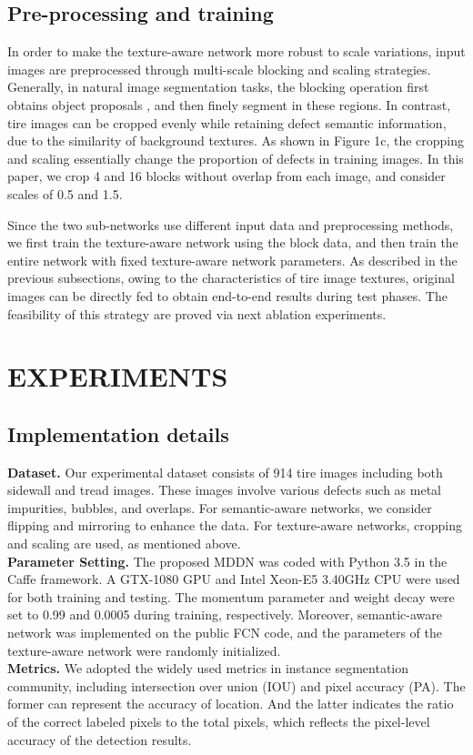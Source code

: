 \documentclass{article}
\begin{document}
\subsection{Pre-processing and training}
\label{Combination}
In order to make the texture-aware network more robust to scale variations, input images are preprocessed through multi-scale blocking and scaling strategies. Generally, in natural image segmentation tasks, the blocking operation first obtains object proposals \cite{girshick2014rich,ren2015faster}, and then finely segment in these regions. In contrast, tire images can be cropped evenly while retaining defect semantic information, due to the similarity of background textures. As shown in Figure 1c, the cropping and scaling essentially change the proportion of defects in training images. In this paper, we crop 4 and 16 blocks without overlap from each image, and consider scales of 0.5 and 1.5.

Since the two sub-networks use different input data and preprocessing methods, we first train the texture-aware network using the block data, and then train the entire network with fixed texture-aware network parameters. As described in the previous subsections, owing to the characteristics of tire image textures, original images can be directly fed to obtain end-to-end results during test phases. The feasibility of this strategy are proved via next ablation experiments.




\section{EXPERIMENTS}
\label{sec:pagestyle}
\subsection{Implementation details}
\label{Implementation details}
{\bf Dataset.} Our experimental dataset consists of 914 tire images including both sidewall and tread images. These images involve various defects such as metal impurities, bubbles, and overlaps. For semantic-aware networks, we consider flipping and mirroring to enhance the data. For texture-aware networks, cropping and scaling are used, as mentioned above.\\
{\bf Parameter Setting.} The proposed MDDN was coded with Python 3.5 in the Caffe framework. A GTX-1080 GPU and Intel Xeon-E5 3.40GHz CPU were used for both training and testing. The momentum parameter and weight decay were set to 0.99 and 0.0005 during training, respectively. Moreover, semantic-aware network was implemented on the public FCN code, and the parameters of the texture-aware network were randomly initialized. \\
{\bf Metrics.} We adopted the widely used metrics in instance segmentation community, including intersection over union (IOU) and pixel accuracy (PA). The former can represent the accuracy of location. And the latter indicates the ratio of the correct labeled pixels to the total pixels, which reflects the pixel-level accuracy of the detection results.
\end{document}
